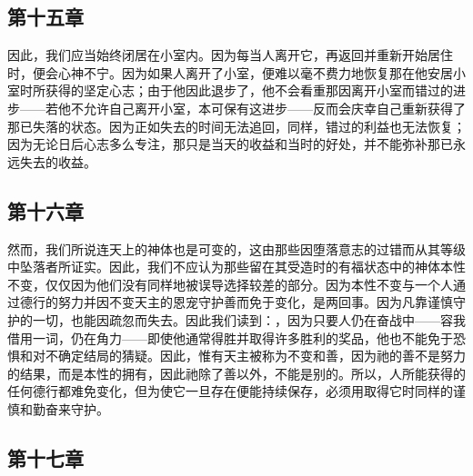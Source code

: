 
\subsection{第十五章}

\par

因此，我们应当始终闭居在小室内。因为每当人离开它，再返回并重新开始居住时，便会心神不宁。因为如果人离开了小室，便难以毫不费力地恢复那在他安居小室时所获得的坚定心志；由于他因此退步了，他不会看重那因离开小室而错过的进步——若他不允许自己离开小室，本可保有这进步——反而会庆幸自己重新获得了那已失落的状态。因为正如失去的时间无法追回，同样，错过的利益也无法恢复；因为无论日后心志多么专注，那只是当天的收益和当时的好处，并不能弥补那已永远失去的收益。\par


\subsection{第十六章}

\par

然而，我们所说连天上的神体也是可变的，这由那些因堕落意志的过错而从其等级中坠落者所证实。因此，我们不应认为那些留在其受造时的有福状态中的神体本性不变，仅仅因为他们没有同样地被误导选择较差的部分。因为本性不变与一个人通过德行的努力并因不变天主的恩宠守护善而免于变化，是两回事。因为凡靠谨慎守护的一切，也能因疏忽而失去。因此我们读到：，因为只要人仍在奋战中——容我借用一词，仍在角力——即使他通常得胜并取得许多胜利的奖品，他也不能免于恐惧和对不确定结局的猜疑。因此，惟有天主被称为不变和善，因为祂的善不是努力的结果，而是本性的拥有，因此祂除了善以外，不能是别的。所以，人所能获得的任何德行都难免变化，但为使它一旦存在便能持续保存，必须用取得它时同样的谨慎和勤奋来守护。\par


\subsection{第十七章}

